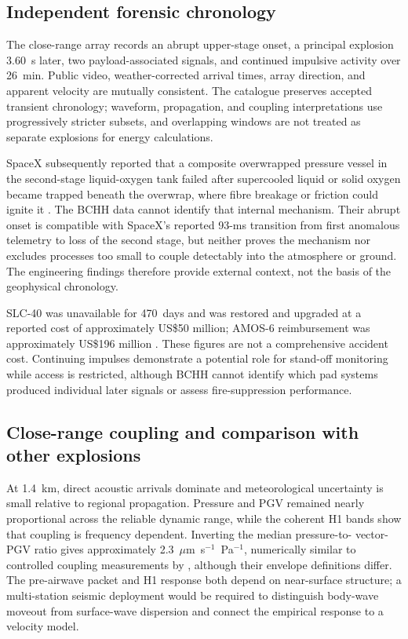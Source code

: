 \documentclass[]{seismica}
\begin{document}
\subsection{Independent forensic chronology}

The close-range array records an abrupt upper-stage onset, a principal
explosion 3.60~s later, two payload-associated signals, and continued
impulsive activity over 26~min. Public video, weather-corrected arrival times,
array direction, and apparent velocity are mutually consistent. The catalogue
preserves accepted transient chronology; waveform, propagation, and coupling
interpretations use progressively stricter subsets, and overlapping windows
are not treated as separate explosions for energy calculations.

SpaceX subsequently reported that a composite overwrapped pressure vessel in
the second-stage liquid-oxygen tank failed after supercooled liquid or solid
oxygen became trapped beneath the overwrap, where fibre breakage or friction
could ignite it \citep{spacex_anomaly_2017,nasa_sma_falcon9}. The BCHH data
cannot identify that internal mechanism. Their abrupt onset is compatible with
SpaceX's reported 93-ms transition from first anomalous telemetry to loss of
the second stage, but neither proves the mechanism nor excludes processes too
small to couple detectably into the atmosphere or ground. The engineering
findings therefore provide external context, not the basis of the geophysical
chronology.

SLC-40 was unavailable for 470~days and was restored and upgraded at a reported
cost of approximately US\$50 million; AMOS-6 reimbursement was approximately
US\$196 million \citep{clark_slc40_2017,magan_amos6_2016,
spacex_crs13_2017}. These figures are not a comprehensive accident cost.
Continuing impulses demonstrate a potential role for stand-off monitoring
while access is restricted, although BCHH cannot identify which pad systems
produced individual later signals or assess fire-suppression performance.

\subsection{Close-range coupling and comparison with other explosions}

At 1.4~km, direct acoustic arrivals dominate and meteorological uncertainty is
small relative to regional propagation. Pressure and PGV remained nearly
proportional across the reliable dynamic range, while the coherent H1 bands
show that coupling is frequency dependent. Inverting the median pressure-to-
vector-PGV ratio gives approximately
2.3~$\mu$m~s$^{-1}$~Pa$^{-1}$, numerically similar to controlled coupling
measurements by \citet{novoselov_ground_coupling_2020}, although their envelope
definitions differ. The pre-airwave packet and H1 response both depend on
near-surface structure; a multi-station seismic deployment would be required
to distinguish body-wave moveout from surface-wave dispersion and connect the
empirical response to a velocity model.
\end{document}
